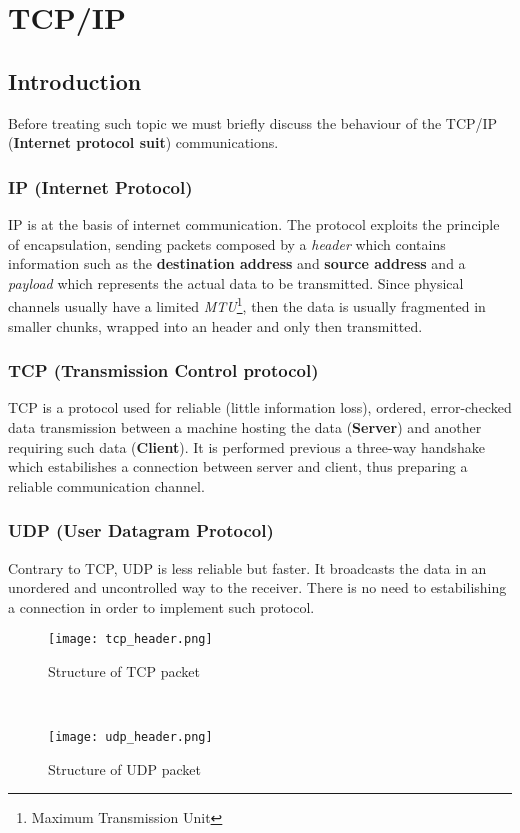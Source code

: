 \documentclass[../../main.tex]{subfiles}
\begin{document}
    

\section{TCP/IP}
\subsection{Introduction}
Before treating such topic we must briefly discuss the behaviour of the
TCP/IP (\textbf{Internet protocol suit}) communications.

\subsubsection{IP (Internet Protocol)} IP is at the basis of internet
communication. The protocol exploits the principle of encapsulation, sending
packets composed by a \emph{header} which contains information such as the
\textbf{destination address} and \textbf{source address} and a
\emph{payload} which represents the actual data to be transmitted.
Since physical channels usually have a limited \emph{MTU}\footnote{Maximum
Transmission Unit}, then the data is usually fragmented in smaller chunks,
wrapped into an header and only then transmitted.

\subsubsection{TCP (Transmission Control protocol)} TCP is a protocol used for
reliable (little information loss), ordered, error-checked data transmission
between a machine hosting the data (\textbf{Server}) and another requiring
such data (\textbf{Client}). It is performed previous a three-way handshake
which estabilishes a connection between server and client, thus preparing a
reliable communication channel.

\subsubsection{UDP (User Datagram Protocol)} Contrary to TCP, UDP is less
reliable but faster.
It broadcasts the data in an unordered and uncontrolled way to the receiver. 
There is no need to estabilishing a connection in order to implement such
protocol.

\begin{figure*}[h]
    \centering
    \begin{subfigure}{.45\textwidth}
        \centering
        \texttt{[image: tcp\_header.png]}
        \caption{Structure of TCP packet}
    \end{subfigure}%
    ~
    \begin{subfigure}{.45\textwidth}
        \centering
        \texttt{[image: udp\_header.png]}
        \caption{Structure of UDP packet}
    \end{subfigure}
\end{figure*}
\end{document}
